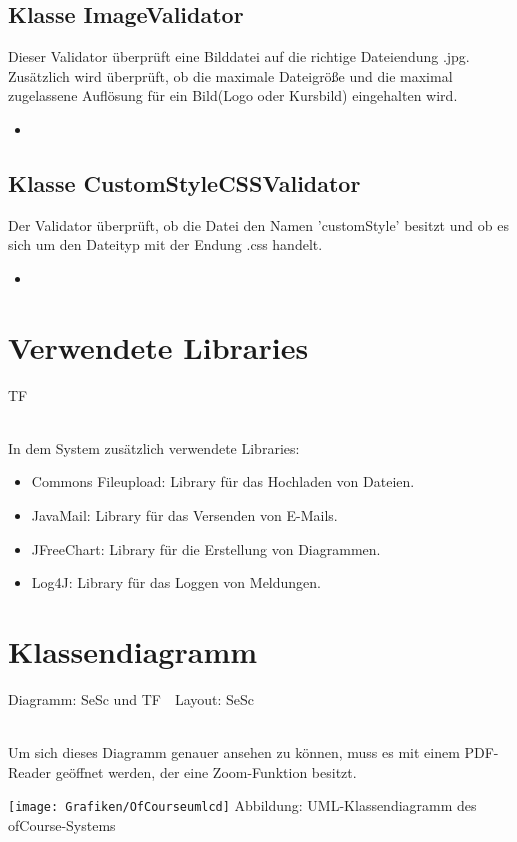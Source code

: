 	\subsection{Klasse ImageValidator}
	Dieser Validator überprüft eine Bilddatei auf die richtige Dateiendung .jpg. Zusätzlich wird überprüft, ob
	die maximale Dateigröße und die maximal zugelassene Auflösung für ein Bild(Logo oder Kursbild) eingehalten wird.
	\begin{itemize}
		\item \override
	\end{itemize}
	
	\subsection{Klasse CustomStyleCSSValidator}
	Der Validator überprüft, ob die Datei den Namen 'customStyle' besitzt und ob es sich um den Dateityp mit der Endung .css handelt.
	\begin{itemize}
		\item \override
	\end{itemize}
		
	\section{Verwendete Libraries}
	\begin{tiny}
		TF\\
	\end{tiny}\\
	In dem System zusätzlich verwendete Libraries:
	\begin{itemize}
		\item Commons Fileupload: Library für das Hochladen von Dateien.
		\item JavaMail: Library für das Versenden von E-Mails.
		\item JFreeChart: Library für die Erstellung von Diagrammen.
		\item Log4J: Library für das Loggen von Meldungen.
	\end{itemize}

	\section{Klassendiagramm}
	\begin{tiny}
		Diagramm: SeSc und TF\ \ Layout: SeSc\\
	\end{tiny}\\
	Um sich dieses Diagramm genauer ansehen zu können, muss es mit einem PDF-Reader
	geöffnet werden, der eine Zoom-Funktion besitzt.
	
	\begin{center}
		\texttt{[image: Grafiken/OfCourseumlcd]}
		Abbildung: UML-Klassendiagramm des ofCourse-Systems
	\end{center}


